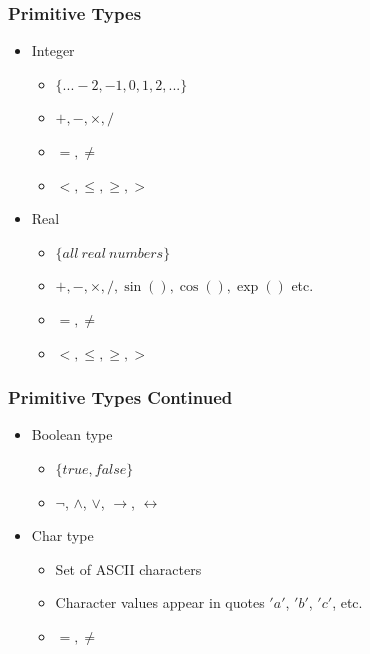 \documentclass[t,12pt,numbers,fleqn]{beamer}
\begin{document}

\begin{frame}
\frametitle{Primitive Types}
\begin{itemize}
\item Integer
\begin{itemize}
\item $\{ ... -2, -1, 0, 1, 2, ... \}$
\item $+, -, \times, /$
\item $=, \neq$
\item $<, \leq, \geq, >$
\end{itemize}
\item Real
\begin{itemize}
\item $\{ all~real~numbers \}$
\item $+, -, \times, /, \sin (), \cos (), \exp ()$ etc.
\item $=, \neq$
\item $<, \leq, \geq, >$
\end{itemize}
\end{itemize}
\end{frame}


\begin{frame}
\frametitle{Primitive Types Continued}
\begin{itemize}
\item Boolean type
\begin{itemize}
\item $\{ true, false \}$
\item $\neg$, $\wedge$, $\vee$, $\rightarrow$, $\leftrightarrow$
\end{itemize}
\item Char type
\begin{itemize}
\item Set of ASCII characters
\item Character values appear in quotes $'a'$, $'b'$, $'c'$, etc.
\item $=, \neq$
\end{itemize}
\end{itemize}
\end{frame}

\end{document}
